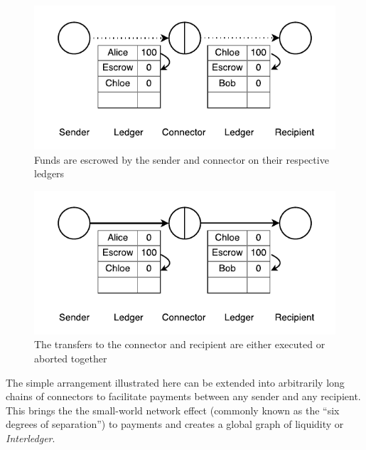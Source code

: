 \documentclass[letterpaper,twocolumn,10pt]{article}
\begin{document}
\begin{figure}[ht]
    \centering
    \includegraphics[width=\columnwidth]{figures/connector-escrow.pdf}
    \caption{Funds are escrowed by the sender and connector on their respective ledgers}
    \label{fig:connector-escrow}
\end{figure}

\begin{figure}[ht]
    \centering
    \includegraphics[width=\columnwidth]{figures/connector-execution.pdf}
    \caption{The transfers to the connector and recipient are either executed or aborted together}
    \label{fig:connector-execution}
\end{figure}

The simple arrangement illustrated here can be extended into arbitrarily long chains of connectors to facilitate payments between any sender and any recipient. 
This brings the the small-world network effect (commonly known as the ``six degrees of separation'') \cite{albert1999internet,watts1998collective} to payments and creates a global graph of liquidity or \mbox{\textit{Interledger}}.

\end{document}
